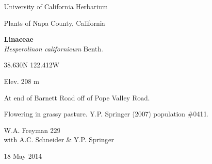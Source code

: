 \documentclass[letterpaper,10pt]{article}
\begin{document}
\begin{minipage}[t]{0.40\textwidth}

\begin{center}
University of California Herbarium \\
\begin{large}
Plants of Napa County, California \\
\end{large}
\vspace{\baselineskip}
\textbf{Linaceae} \\
\textit{Hesperolinon californicum} Benth.\\
\end{center}

\begin{footnotesize}

\begin{multicols}{2}
38.630\textdegree N 122.412\textdegree W
\columnbreak
\begin{flushright}
Elev. 208 m
\end{flushright}
\end{multicols}

At end of Barnett Road off of Pope Valley Road.
\vspace{\baselineskip}

Flowering in grassy pasture. Y.P. Springer (2007) population \#0411.

\begin{multicols}{2}
W.A. Freyman 229 \\
with A.C. Schneider \& Y.P. Springer
\columnbreak
\begin{flushright}
18 May 2014
\end{flushright}
\end{multicols}

\end{footnotesize}

\end{minipage}

\vspace{2cm}
%
%

%
%
\end{document}
